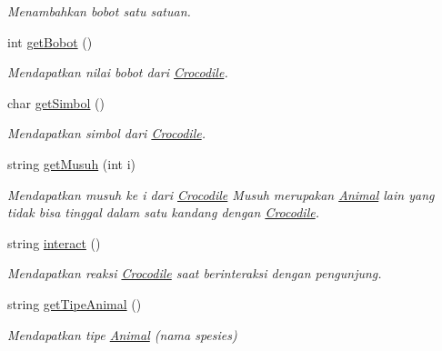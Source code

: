 \begin{DoxyCompactItemize}
\begin{DoxyCompactList}\small\item\em Menambahkan bobot satu satuan. \end{DoxyCompactList}\item 
int \hyperlink{classCrocodile_a9c767a7111f928236b068cae4445f631}{get\-Bobot} ()
\begin{DoxyCompactList}\small\item\em Mendapatkan nilai bobot dari \hyperlink{classCrocodile}{Crocodile}. \end{DoxyCompactList}\item 
char \hyperlink{classCrocodile_a924b698aef1f1d83761ebe0dea1f4510}{get\-Simbol} ()
\begin{DoxyCompactList}\small\item\em Mendapatkan simbol dari \hyperlink{classCrocodile}{Crocodile}. \end{DoxyCompactList}\item 
string \hyperlink{classCrocodile_abe0f3118e9e65974dc8693e0e118a149}{get\-Musuh} (int i)
\begin{DoxyCompactList}\small\item\em Mendapatkan musuh ke i dari \hyperlink{classCrocodile}{Crocodile} Musuh merupakan \hyperlink{classAnimal}{Animal} lain yang tidak bisa tinggal dalam satu kandang dengan \hyperlink{classCrocodile}{Crocodile}. \end{DoxyCompactList}\item 
string \hyperlink{classCrocodile_aeacbf1ca7d8d5549891604f1e2831dde}{interact} ()
\begin{DoxyCompactList}\small\item\em Mendapatkan reaksi \hyperlink{classCrocodile}{Crocodile} saat berinteraksi dengan pengunjung. \end{DoxyCompactList}\item 
string \hyperlink{classCrocodile_afe701f28f0d3471eeea91b1be20529b3}{get\-Tipe\-Animal} ()
\begin{DoxyCompactList}\small\item\em Mendapatkan tipe \hyperlink{classAnimal}{Animal} (nama spesies) \end{DoxyCompactList}\end{DoxyCompactItemize}
